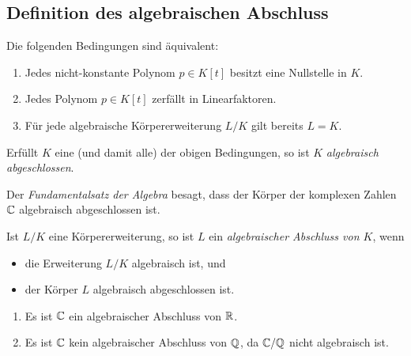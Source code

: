 \subsection{Definition des algebraischen Abschluss}

\begin{lemma}
  Die folgenden Bedingungen sind äquivalent:
  \begin{enumerate}
    \item
      Jedes nicht-konstante Polynom $p \in K[t]$ besitzt eine Nullstelle in $K$.
    \item
      Jedes Polynom $p \in K[t]$ zerfällt in Linearfaktoren.
    \item
      Für jede algebraische Körpererweiterung $L/K$ gilt bereits $L = K$.
  \end{enumerate}
\end{lemma}

\begin{definition}
  Erfüllt $K$ eine \textup(und damit alle\textup) der obigen Bedingungen, so ist $K$ \emph{algebraisch abgeschlossen}.
\end{definition}

\begin{example}
  Der \emph{Fundamentalsatz der Algebra} besagt, dass der Körper der komplexen Zahlen $\mathbb{C}$ algebraisch abgeschlossen ist.
\end{example}

\begin{definition}
  Ist $L/K$ eine Körpererweiterung, so ist $L$ ein \emph{algebraischer Abschluss von $K$}, wenn
  \begin{itemize}
    \item
      die Erweiterung $L/K$ algebraisch ist, und
    \item
      der Körper $L$ algebraisch abgeschlossen ist.
  \end{itemize}
\end{definition}

\begin{example}
  \begin{enumerate}
    \item
      Es ist $\mathbb{C}$ ein algebraischer Abschluss von $\mathbb{R}$.
    \item
      Es ist $\mathbb{C}$ kein algebraischer Abschluss von $\mathbb{Q}$, da $\mathbb{C}/\mathbb{Q}$ nicht algebraisch ist.
  \end{enumerate}
\end{example}



